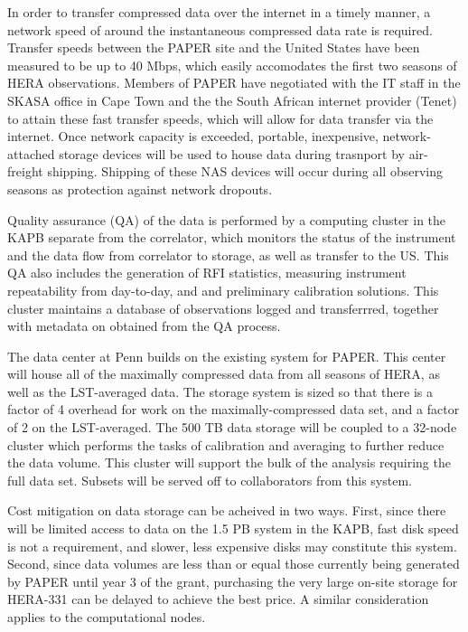 \documentclass[preprint]{aastex}
\begin{document}
In order to transfer compressed data over the internet in a timely
manner, a network speed of around the instantaneous compressed data
rate is required. Transfer speeds between the PAPER site and the
United States have been measured to be up to 40 Mbps, which easily
accomodates the first two seasons of HERA observations. Members of
PAPER have negotiated with the IT staff in the SKASA office in Cape
Town and the the South African internet provider (Tenet) to attain
these fast transfer speeds, which will allow for data transfer via the
internet. Once network capacity is exceeded, portable, inexpensive,
network-attached storage devices will be used to house data during
trasnport by air-freight shipping. Shipping of these NAS devices will
occur during all observing seasons as protection against network
dropouts.

Quality assurance (QA) of the data is performed by a computing cluster
in the KAPB separate from the correlator, which monitors the status of
the instrument and the data flow from correlator to storage, as well
as transfer to the US.  This QA also includes the generation of RFI
statistics, measuring instrument repeatability from day-to-day, and
and preliminary calibration solutions.  This cluster maintains a
database of observations logged and transferrred, together with
metadata on obtained from the QA process.


The data center at Penn builds on the existing system for PAPER.  This
center will house all of the maximally compressed data from all
seasons of HERA, as well as the LST-averaged data.  The storage system
is sized so that there is a factor of 4 overhead for work on the
maximally-compressed data set, and a factor of 2 on the LST-averaged.
The 500 TB data storage will be coupled to a 32-node cluster which
performs the tasks of calibration and averaging to further reduce the
data volume.  This cluster will support the bulk of the analysis
requiring the full data set.  Subsets will be served off to
collaborators from this system.

Cost mitigation on data storage can be acheived in two ways. First,
since there will be limited access to data on the 1.5 PB system in the
KAPB, fast disk speed is not a requirement, and slower, less expensive
disks may constitute this system.  Second, since data volumes are less
than or equal those currently being generated by PAPER until year 3 of
the grant, purchasing the very large on-site storage for HERA-331 can
be delayed to achieve the best price.  A similar consideration applies
to the computational nodes.
\end{document}

